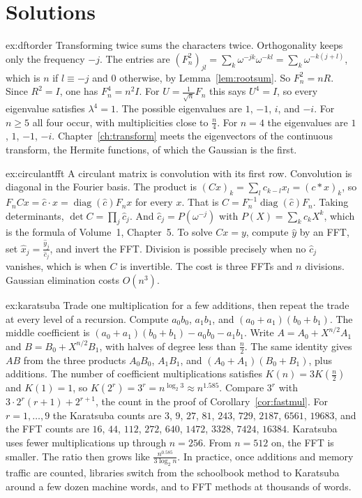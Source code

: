\section{Solutions}

\begin{solution}{ex:dftorder}
\idea Transforming twice sums the characters twice. Orthogonality keeps only the frequency $-j$.
\writeup The entries are $(F_n^2)_{jl}=\sum_k\omega^{-jk}\omega^{-kl}=\sum_k\omega^{-k(j+l)}$, which is $n$ if $l\equiv -j$ and $0$ otherwise, by Lemma~\ref{lem:rootsum}. So $F_n^2=nR$. Since $R^2=I$, one has $F_n^4=n^2I$. For $U=\frac1{\sqrt n}F_n$ this says $U^4=I$, so every eigenvalue satisfies $\lambda^4=1$. The possible eigenvalues are $1$, $-1$, $i$, and $-i$. For $n\ge5$ all four occur, with multiplicities close to $\frac n4$. For $n=4$ the eigenvalues are $1$, $1$, $-1$, $-i$. Chapter~\ref{ch:transform} meets the eigenvectors of the continuous transform, the Hermite functions, of which the Gaussian is the first.
\end{solution}

\begin{solution}{ex:circulantfft}
\idea A circulant matrix is convolution with its first row. Convolution is diagonal in the Fourier basis.
\writeup The product is $(Cx)_k=\sum_l c_{k-l}x_l=(c*x)_k$, so $F_nCx=\hat c\cdot\hat x=\operatorname{diag}(\hat c)F_nx$ for every $x$. That is $C=F_n^{-1}\operatorname{diag}(\hat c)F_n$. Taking determinants, $\det C=\prod_j\hat c_j$. And $\hat c_j=P(\omega^{-j})$ with $P(X)=\sum_k c_kX^k$, which is the formula of Volume~1, Chapter~5. To solve $Cx=y$, compute $\hat y$ by an FFT, set $\hat x_j=\frac{\hat y_j}{\hat c_j}$, and invert the FFT. Division is possible precisely when no $\hat c_j$ vanishes, which is when $C$ is invertible. The cost is three FFTs and $n$ divisions. Gaussian elimination costs $O(n^3)$.
\end{solution}

\begin{solution}{ex:karatsuba}
\idea Trade one multiplication for a few additions, then repeat the trade at every level of a recursion.
\writeup Compute $a_0b_0$, $a_1b_1$, and $(a_0+a_1)(b_0+b_1)$. The middle coefficient is $(a_0+a_1)(b_0+b_1)-a_0b_0-a_1b_1$. Write $A=A_0+X^{n/2}A_1$ and $B=B_0+X^{n/2}B_1$, with halves of degree less than $\frac n2$. The same identity gives $AB$ from the three products $A_0B_0$, $A_1B_1$, and $(A_0+A_1)(B_0+B_1)$, plus additions. The number of coefficient multiplications satisfies $K(n)=3K(\frac n2)$ and $K(1)=1$, so $K(2^r)=3^r=n^{\log_2 3}\approx n^{1.585}$. Compare $3^r$ with $3\cdot2^r(r+1)+2^{r+1}$, the count in the proof of Corollary~\ref{cor:fastmul}. For $r=1,\ldots,9$ the Karatsuba counts are $3$, $9$, $27$, $81$, $243$, $729$, $2187$, $6561$, $19683$, and the FFT counts are $16$, $44$, $112$, $272$, $640$, $1472$, $3328$, $7424$, $16384$. Karatsuba uses fewer multiplications up through $n=256$. From $n=512$ on, the FFT is smaller. The ratio then grows like $\frac{n^{0.585}}{3\log_2 n}$. In practice, once additions and memory traffic are counted, libraries switch from the schoolbook method to Karatsuba around a few dozen machine words, and to FFT methods at thousands of words.
\end{solution}

